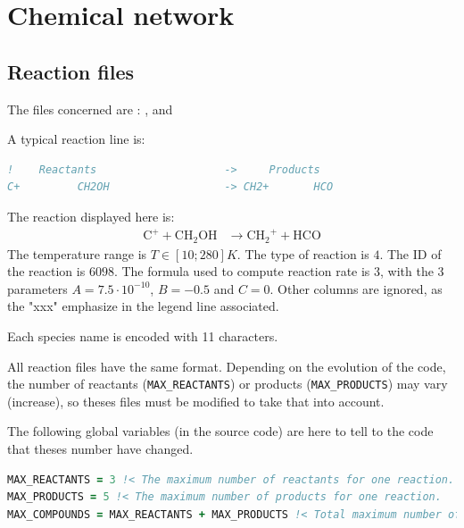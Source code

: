 \documentclass[english,a4paper,twoside]{article}
\begin{document}
\section{Chemical network}\label{sec:chemical-network}
\subsection{Reaction files}
The files concerned are : ,  and 

A typical reaction line is:
\begin{lstlisting}[language=Fortran]
!    Reactants                    ->     Products                                                A          B          C      xxxxxxxxxxxxxxxxxxxxx ITYPE Tmin   Tmax formula ID xxxxx
C+         CH2OH                  -> CH2+       HCO                                           7.500E-10 -5.000E-01  0.000E+00 0.00e+00 0.00e+00   NA  4     10    280  3  6098 1  1
\end{lstlisting}
The reaction displayed here is:
\begin{align*}
\mathrm{C^+} + \mathrm{CH_2OH} &\rightarrow \mathrm{CH_2}^+ + \mathrm{HCO}
\end{align*}
The temperature range is $T\in[10;280]\unit{K}$. The type of reaction is $4$. The ID of the reaction is $6098$. The formula used to compute reaction rate is $3$, with the 3 parameters $A=7.5\cdot 10^{-10}$, $B=-0.5$ and $C=0$. Other columns are ignored, as the "xxx" emphasize in the legend line associated.

\bigskip

Each species name is encoded with 11 characters.

All reaction files have the same format. Depending on the evolution of the code, the number of reactants (\verb|MAX_REACTANTS|) or products (\verb|MAX_PRODUCTS|) may vary (increase), so theses files must be modified to take that into account. 

The following global variables (in the source code) are here to tell to the code that theses number have changed. 
\begin{lstlisting}[language=Fortran]
MAX_REACTANTS = 3 !< The maximum number of reactants for one reaction.
MAX_PRODUCTS = 5 !< The maximum number of products for one reaction.
MAX_COMPOUNDS = MAX_REACTANTS + MAX_PRODUCTS !< Total maximum number of compounds for one reaction (reactants + products)
\end{lstlisting}
\end{document}
